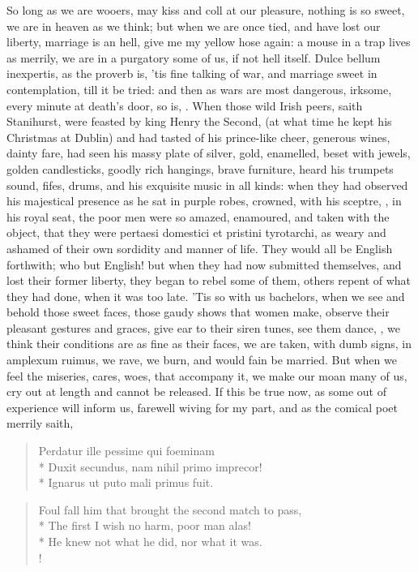 So long as we are wooers, may kiss and coll at our pleasure, nothing is
so sweet, we are in heaven as we think; but when we are once tied, and
have lost our liberty, marriage is an hell, give me my yellow hose
again: a mouse in a trap lives as merrily, we are in a purgatory some
of us, if not hell itself. Dulce bellum inexpertis, as the proverb is,
'tis fine talking of war, and marriage sweet in contemplation, till it
be tried: and then as wars are most dangerous, irksome, every minute at
death's door, so is, \etc{}. When those wild Irish peers, saith
Stanihurst, were feasted by king Henry the Second, (at what time
he kept his Christmas at Dublin) and had tasted of his prince-like
cheer, generous wines, dainty fare, had seen his massy plate of
silver, gold, enamelled, beset with jewels, golden candlesticks, goodly
rich hangings, brave furniture, heard his trumpets sound, fifes, drums,
and his exquisite music in all kinds: when they had observed his
majestical presence as he sat in purple robes, crowned, with his
sceptre, \etc{}, in his royal seat, the poor men were so amazed,
enamoured, and taken with the object, that they were pertaesi domestici
et pristini tyrotarchi, as weary and ashamed of their own sordidity and
manner of life. They would all be English forthwith; who but English!
but when they had now submitted themselves, and lost their former
liberty, they began to rebel some of them, others repent of what they
had done, when it was too late. 'Tis so with us bachelors, when we see
and behold those sweet faces, those gaudy shows that women make,
observe their pleasant gestures and graces, give ear to their siren
tunes, see them dance, \etc{}, we think their conditions are as fine as
their faces, we are taken, with dumb signs, in amplexum ruimus, we
rave, we burn, and would fain be married. But when we feel the
miseries, cares, woes, that accompany it, we make our moan many of us,
cry out at length and cannot be released. If this be true now, as some
out of experience will inform us, farewell wiving for my part, and as
the comical poet merrily saith,
%
\begin{latin}
\begin{verse}%
Perdatur ille pessime qui foeminam\\*
Duxit secundus, nam nihil primo imprecor!\\*
Ignarus ut puto mali primus fuit.
\end{verse}%
\end{latin}
\translationrule%
\begin{verse}%
Foul fall him that brought the second match to pass,\\*
The first I wish no harm, poor man alas!\\*
He knew not what he did, nor what it was.\\!
\end{verse}%
%

